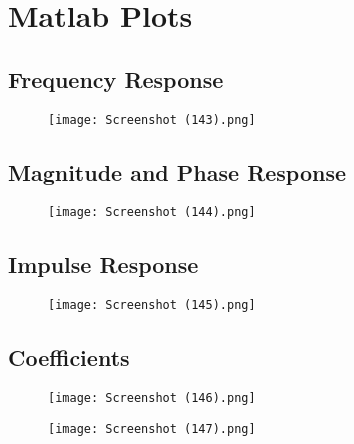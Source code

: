 \documentclass{article}
\begin{document}
\section{Matlab Plots}
\subsection{Frequency Response}
\begin{figure}[H]
\hspace*{-2.5cm}
    \centering
    \texttt{[image: Screenshot (143).png]}
    \label{fig:my_label}
\end{figure}

\subsection{Magnitude and Phase Response}
\begin{figure}[H]
\hspace*{-4cm}
    \centering
    \texttt{[image: Screenshot (144).png]}
    \label{fig:my_label}
\end{figure}

\subsection{Impulse Response}
\begin{figure}[H]
\hspace*{-2.5cm}
    \centering
    \texttt{[image: Screenshot (145).png]}
    \label{fig:my_label}
\end{figure}

\subsection{Coefficients}
\begin{figure}[H]
\hspace*{-2.5cm}
    \centering
    \texttt{[image: Screenshot (146).png]}
    \label{fig:my_label}
\end{figure}

\begin{figure}[H]
\hspace*{-2.5cm}
    \centering
    \texttt{[image: Screenshot (147).png]}
    \label{fig:my_label}
\end{figure}
\end{document}
